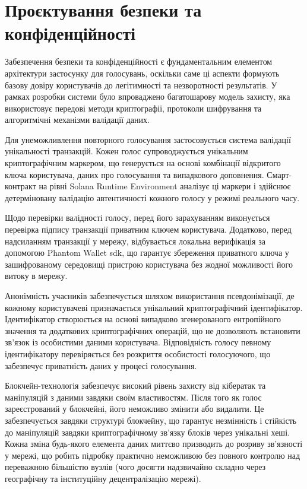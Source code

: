 \documentclass[14pt]{extreport}
\begin{document}
  \section{Проєктування безпеки та конфіденційності}
  
  Забезпечення безпеки та конфіденційності є фундаментальним елементом архітектури застосунку для голосувань, оскільки саме ці аспекти формують базову довіру користувачів до легітимності та незворотності результатів. У рамках розробки системи було впроваджено багатошарову модель захисту, яка використовує передові методи криптографії, протоколи шифрування та алгоритмічні механізми валідації даних.

  Для унеможливлення повторного голосування застосовується система валідації унікальності транзакцій. Кожен голос супроводжується унікальним криптографічним маркером, що генерується на основі комбінації відкритого ключа користувача, даних про голосування та випадкового доповнення. Смарт-контракт на рівні Solana Runtime Environment аналізує ці маркери і здійснює детерміновану валідацію автентичності кожного голосу у режимі реального часу.

  Щодо перевірки валідності голосу, перед його зарахуванням виконується перевірка підпису транзакції приватним ключем користувача. Додатково, перед надсиланням транзакції у мережу, відбувається локальна верифікація за допомогою Phantom Wallet \gls{sdk}, що гарантує збереження приватного ключа у зашифрованому середовищі пристрою користувача без жодної можливості його витоку в мережу.

  Анонімність учасників забезпечується шляхом використання псевдонімізації, де кожному користувачеві призначається унікальний криптографічний ідентифікатор. Ідентифікатор створюється на основі випадково згенерованого ентропійного значення та додаткових криптографічних операцій, що не дозволяють встановити зв'язок із особистими даними користувача. Відповідність голосу певному ідентифікатору перевіряється без розкриття особистості голосуючого, що забезпечує приватність даних у процесі голосування.
  
  Блокчейн-технологія забезпечує високий рівень захисту від кібератак та маніпуляцій з даними завдяки своїм властивостям. Після того як голос зареєстрований у блокчейні, його неможливо змінити або видалити. Це забезпечується завдяки структурі блокчейну, що гарантує незмінність і стійкість до маніпуляцій завдяки криптографічному зв'язку блоків через унікальні хеші. Кожна зміна будь-якого елемента даних миттєво призводить до розриву зв'язності у мережі, що робить підробку практично неможливою без повного контролю над переважною більшістю вузлів (чого досягти надзвичайно складно через географічну та інституційну децентралізацію мережі).
  
\end{document}
